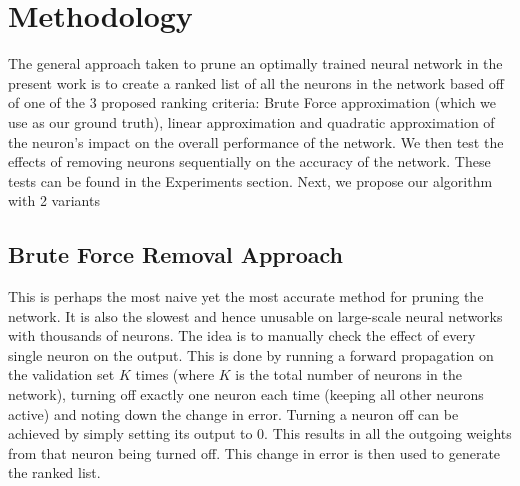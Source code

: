 \section{Methodology}
The general approach taken to prune an optimally trained neural network in the present work is to create a ranked list of all the neurons in the network based off of one of the 3 proposed ranking criteria: Brute Force approximation (which we use as our ground truth), linear approximation and quadratic approximation of the neuron's impact on the overall performance of the network. We then test the effects of removing neurons sequentially on the accuracy of the network. These tests can be found in the Experiments section. Next, we propose our algorithm with 2 variants

\subsection{Brute Force Removal Approach}
This is perhaps the most naive yet the most accurate method for pruning the network. It is also the slowest and hence unusable on large-scale neural networks with thousands of neurons. The idea is to manually check the effect of every single neuron on the output. This is done by running a forward propagation on the validation set $K$ times (where $K$ is the total number of neurons in the network), turning off exactly one neuron each time (keeping all other neurons active) and noting down the change in error. Turning a neuron off can be achieved by simply setting its output to 0. This results in all the outgoing weights from that neuron being turned off. This change in error is then used to generate the ranked list. 





